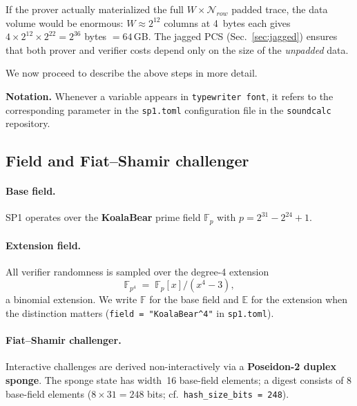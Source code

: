 \documentclass[11pt]{article}
\begin{document}
If the prover actually materialized the full $W\times\mathcal{N}_{row}$ padded trace,
the data volume would be enormous:
$W\approx 2^{12}$ columns at 4~bytes each gives
$4\times 2^{12}\times 2^{22}=2^{36}$ bytes $= 64\,$GB.
The jagged PCS (Sec.~\ref{sec:jagged}) ensures that both prover and verifier costs
depend only on the size of the \emph{unpadded} data.


We now proceed to describe the above steps in more detail.

\medskip\noindent
\textbf{Notation.}
Whenever a variable appears in \texttt{typewriter font},
it refers to the corresponding parameter in the
\texttt{sp1.toml} configuration file in the \texttt{soundcalc} repository.

\subsection{Field and Fiat--Shamir challenger}\label{sec:field}

\paragraph{Base field.}
SP1 operates over the \textbf{KoalaBear} prime field
$\mathbb{F}_p$ with $p=2^{31}-2^{24}+1$.


\paragraph{Extension field.}
All verifier randomness is sampled over the degree-4 extension
\[
  \mathbb{F}_{p^4} \;=\; \mathbb{F}_p[x]\big/(x^4-3),
\]
a binomial extension.
We write $\mathbb{F}$ for the base field and $\mathbb{E}$ for the extension
when the distinction matters (\texttt{field = "KoalaBear\^{}4"} in \texttt{sp1.toml}).

\paragraph{Fiat--Shamir challenger.}
Interactive challenges are derived non-interactively via a
\textbf{Poseidon-2 duplex sponge}.
The sponge state has width~16 base-field elements;
a digest consists of 8 base-field elements
($8\times 31 = 248$ bits; cf.\ \texttt{hash\_size\_bits = 248}).
\end{document}
